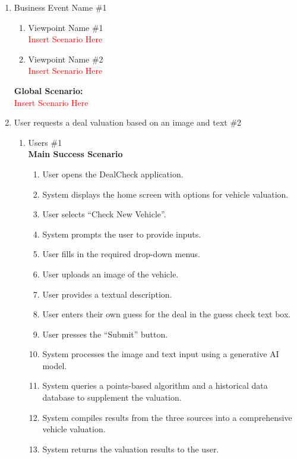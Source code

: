 \documentclass[]{article}
\begin{document}
\begin{enumerate}[{\bf {BE}1.}]

	\item Business Event Name \#1
		\begin{enumerate}[{\bf VP1.}]
			\item Viewpoint Name \#1 \\
				\textcolor{red}{Insert Scenario Here}
			\item Viewpoint Name \#2 \\
				\textcolor{red}{Insert Scenario Here}
		\end{enumerate}
		{\bf Global Scenario:}\\
		\textcolor{red}{Insert Scenario Here}

  \item User requests a deal valuation based on an image and text \#2
    \begin{enumerate}[{\bf VP1.}]
      \item Users \#1 \\
        \textbf{Main Success Scenario}
        \begin{enumerate}[1.]
          \item User opens the DealCheck application.
          \item System displays the home screen with options for vehicle valuation.
          \item User selects ``Check New Vehicle''.
          \item System prompts the user to provide inputs.
          \item User fills in the required drop-down menus.
          \item User uploads an image of the vehicle.
          \item User provides a textual description.
          \item User enters their own guess for the deal in the guess check text box.
          \item User presses the ``Submit'' button.
          \item System processes the image and text input using a generative AI model.
          \item System queries a points-based algorithm and a historical data database to supplement the valuation.
          \item System compiles results from the three sources into a comprehensive vehicle valuation.
          \item System returns the valuation results to the user.

\end{enumerate}
\end{enumerate}
\end{enumerate}
\end{document}
